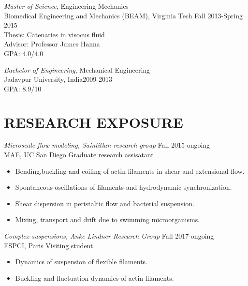 \documentclass[10pt]{res} %
\begin{document}
\begin{resume}
{\sl Master of Science}, Engineering Mechanics \\ 
Biomedical Engineering and Mechanics (BEAM), Virginia Tech \hfill Fall 2013-Spring 2015 \\
Thesis: Catenaries in visocus fluid \\
Advisor: Professor James Hanna \\
GPA: 4.0/4.0

{\sl Bachelor of Engineering}, Mechanical Engineering \\ 
Jadavpur University, India\hfill 2009-2013 \\
GPA: 8.9/10 


 



\section{{RESEARCH EXPOSURE}} 

\vspace{8pt} %

{\sl Microscale flow modeling, Saintillan research group} \hfill Fall 2015-ongoing \\
MAE, UC San Diego \hfill Graduate research assisatant
\vspace{2mm}
\begin{itemize} \itemsep -2pt %
\item Bending,buckling and coiling of actin filaments in shear and extensional flow.
\item Spontaneous oscillations of filaments and hydrodynamic synchronization.
\item Shear dispersion in peristaltic flow and bacterial suspension.
\item Mixing, transport and drift due to swimming microorganisms.
\end{itemize}

{\sl Complex suspensions, Anke Lindner Research Group} \hfill Fall 2017-ongoing \\
ESPCI, Paris \hfill Visiting student
\vspace{2mm}
\begin{itemize} \itemsep -2pt %
	\item Dynamics of suspension of flexible filaments.
	\item Buckling and fluctuation dynamics of actin filaments.
\end{itemize}


\end{resume}
\end{document}
